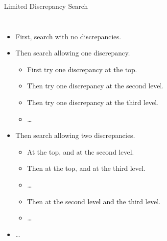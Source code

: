 \documentclass{beamer}
\begin{document}
\begin{frame}{Limited Discrepancy Search}

    \begin{columns}[T]
        \begin{itemize}
            \item First, search with no discrepancies.
            \item Then search allowing one discrepancy.
                \begin{itemize}
                    \item First try one discrepancy at the top.
                    \item Then try one discrepancy at the second level.
                    \item Then try one discrepancy at the third level.
                    \item \ldots
                \end{itemize}
            \item Then search allowing two discrepancies.
                \begin{itemize}
                    \item At the top, and at the second level.
                    \item Then at the top, and at the third level.
                    \item \ldots
                    \item Then at the second level and the third level.
                    \item \ldots
                \end{itemize}
            \item \ldots
        \end{itemize}


\end{columns}
\end{frame}
\end{document}
